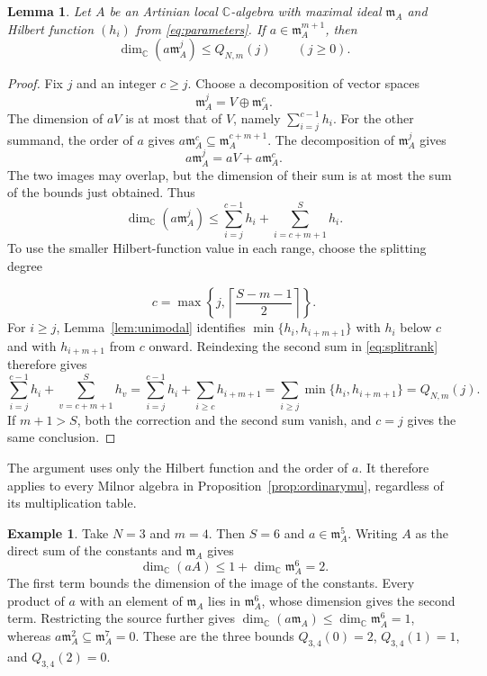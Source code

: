 \documentclass[12pt,reqno]{amsart}
\newcommand{\C}{\mathbb C}
\newcommand{\mm}{\mathfrak m}
\newtheorem{lemma}[theorem]{Lemma}
\theoremstyle{definition}
\newtheorem{example}[theorem]{Example}
\begin{document}
\begin{lemma}\label{lem:rank}
Let $A$ be an Artinian local $\C$-algebra with maximal ideal
$\mm_A$ and Hilbert function $(h_i)$ from \eqref{eq:parameters}.
If $a\in \mm_A^{m+1} $, then
\begin{equation}\label{eq:rankbound}
 \dim_\C(a\mm_A^j)\leq Q_{N,m}(j)\qquad(j\geq0).
\end{equation}
\end{lemma}
\begin{proof}
Fix $j$ and an integer $c\geq j$. Choose a decomposition of
vector spaces
\[
 \mm_A^j=V\oplus\mm_A^c.
\]
The dimension of $aV$ is at most that of $V$, namely
$\sum_{i=j}^{c-1}h_i$. For the other summand, the order of $a$ gives
$a\mm_A^c\subseteq\mm_A^{c+m+1}$.
The decomposition of $\mm_A^j$ gives
\[
 a\mm_A^j=aV+a\mm_A^c.
\]
The two images may overlap, but the dimension of their sum is at
most the sum of the bounds just obtained. Thus
\begin{equation}\label{eq:splitrank}
 \dim_\C(a\mm_A^j)
 \leq\sum_{i=j}^{c-1}h_i+\sum_{i=c+m+1}^{S}h_i.
\end{equation}
To use the smaller Hilbert-function value in each range, choose
the splitting degree

\[
 c=\max\left\{j,\left\lceil\frac{S-m-1}{2}\right\rceil\right\}.
\]
For $i\geq j$, Lemma~\ref{lem:unimodal} identifies
$\min\{h_i,h_{i+m+1}\}$ with $h_i$ below $c$ and with $h_{i+m+1}$
from $c$ onward. Reindexing the second sum in
\eqref{eq:splitrank} therefore gives
\[
 \sum_{i=j}^{c-1}h_i+\sum_{v=c+m+1}^{S}h_v
 =\sum_{i=j}^{c-1}h_i+\sum_{i\geq c}h_{i+m+1}
 =\sum_{i\geq j}\min\{h_i,h_{i+m+1}\}=Q_{N,m}(j).
\]
If $m+1>S$, both the correction and the second sum vanish, and
$c=j$ gives the same conclusion.
\end{proof}

The argument uses only the Hilbert function and the order of $a$.
It therefore applies to every Milnor algebra in
Proposition~\ref{prop:ordinarymu}, regardless of its multiplication
table.

\begin{example}\label{ex:rank}
Take $N=3$ and $m=4$. Then $S=6$ and
$a\in\mm_A^5$.
Writing $A$ as the direct sum of the constants and $\mm_A$ gives
\[
 \dim_\C(aA)\leq1+\dim_\C\mm_A^6=2.
\]
The first term bounds the dimension of the image of the constants.
Every product of $a$ with an element of $\mm_A$ lies in
$\mm_A^6$, whose dimension gives the second term.
Restricting the source further gives
$\dim_\C(a\mm_A)\leq\dim_\C\mm_A^6=1$, whereas
$a\mm_A^2\subseteq\mm_A^7=0$.
These are the three bounds $Q_{3,4}(0)=2$, $Q_{3,4}(1)=1$, and $Q_{3,4}(2)=0$.
\end{example}
\end{document}
